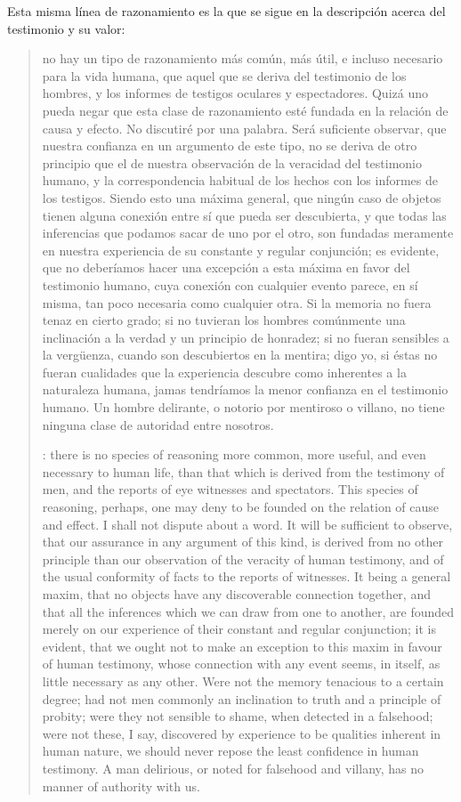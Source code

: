 Esta misma línea de razonamiento es la que se sigue en la descripción acerca del
testimonio y su valor: \blockquote[{\cite[\S10,1. 74]{hume1777enquiry}}: there
is no species of reasoning more common, more useful, and even necessary to human
life, than that which is derived from the testimony of men, and the reports of
eye witnesses and spectators. This species of reasoning, perhaps, one may deny
to be founded on the relation of cause and effect. I shall not dispute about a
word. It will be sufficient to observe, that our assurance in any argument of
this kind, is derived from no other principle than our observation of the
veracity of human testimony, and of the usual conformity of facts to the reports
of witnesses. It being a general maxim, that no objects have any discoverable
connection together, and that all the inferences which we can draw from one to
another, are founded merely on our experience of their constant and regular
conjunction; it is evident, that we ought not to make an exception to this maxim
in favour of human testimony, whose connection with any event seems, in itself,
as little necessary as any other. Were not the memory tenacious to a certain
degree; had not men commonly an inclination to truth and a principle of probity;
were they not sensible to shame, when detected in a falsehood; were not these, I
say, discovered by experience to be qualities inherent in human nature, we
should never repose the least confidence in human testimony. A man delirious, or
noted for falsehood and villany, has no manner of authority with us.]{no hay un
  tipo de razonamiento más común, más útil, e incluso necesario para la vida
  humana, que aquel que se deriva del testimonio de los hombres, y los informes
  de testigos oculares y espectadores. Quizá uno pueda negar que esta clase de
  razonamiento esté fundada en la relación de causa y efecto. No discutiré por
  una palabra. Será suficiente observar, que nuestra confianza en un argumento
  de este tipo, no se deriva de otro principio que el de nuestra observación de
  la veracidad del testimonio humano, y la correspondencia habitual de los
  hechos con los informes de los testigos. Siendo esto una máxima general, que
  ningún caso de objetos tienen alguna conexión entre sí que pueda ser
  descubierta, y que todas las inferencias que podamos sacar de uno por el otro,
  son fundadas meramente en nuestra experiencia de su constante y regular
  conjunción; es evidente, que no deberíamos hacer una excepción a esta máxima
  en favor del testimonio humano, cuya conexión con cualquier evento parece, en
  sí misma, tan poco necesaria como cualquier otra. Si la memoria no fuera tenaz
  en cierto grado; si no tuvieran los hombres comúnmente una inclinación a la
  verdad y un principio de honradez; si no fueran sensibles a la vergüenza,
  cuando son descubiertos en la mentira; digo yo, si éstas no fueran cualidades
  que la experiencia descubre como inherentes a la naturaleza humana, jamas
  tendríamos la menor confianza en el testimonio humano. Un hombre delirante, o
  notorio por mentiroso o villano, no tiene ninguna clase de autoridad entre
  nosotros.}

